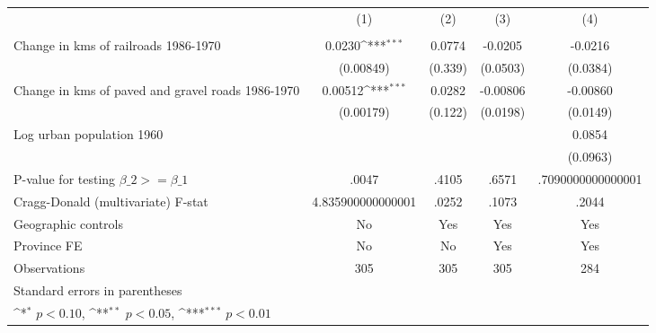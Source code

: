 {
\def\sym#1{\ifmmode^{#1}\else\(^{#1}\)\fi}
\begin{tabular}{l*{4}{c}}
\hline\hline
                &\multicolumn{1}{c}{(1)}&\multicolumn{1}{c}{(2)}&\multicolumn{1}{c}{(3)}&\multicolumn{1}{c}{(4)}\\
                &\multicolumn{1}{c}{}&\multicolumn{1}{c}{}&\multicolumn{1}{c}{}&\multicolumn{1}{c}{}\\
\hline
Change in kms of railroads 1986-1970&   0.0230\sym{***}&   0.0774         &  -0.0205         &  -0.0216         \\
                &(0.00849)         &  (0.339)         & (0.0503)         & (0.0384)         \\
[1em]
Change in kms of paved and gravel roads 1986-1970&  0.00512\sym{***}&   0.0282         & -0.00806         & -0.00860         \\
                &(0.00179)         &  (0.122)         & (0.0198)         & (0.0149)         \\
[1em]
Log urban population 1960&                  &                  &                  &   0.0854         \\
                &                  &                  &                  & (0.0963)         \\
\hline
P-value for testing $\beta\_{2} >= \beta\_{1}$&    .0047         &    .4105         &    .6571         &.7090000000000001         \\
Cragg-Donald (multivariate) F-stat&4.835900000000001         &    .0252         &    .1073         &    .2044         \\
Geographic controls&       No         &      Yes         &      Yes         &      Yes         \\
Province FE     &       No         &       No         &      Yes         &      Yes         \\
Observations    &      305         &      305         &      305         &      284         \\
\hline\hline
\multicolumn{5}{l}{\footnotesize Standard errors in parentheses}\\
\multicolumn{5}{l}{\footnotesize \sym{*} \(p<0.10\), \sym{**} \(p<0.05\), \sym{***} \(p<0.01\)}\\
\end{tabular}
}
